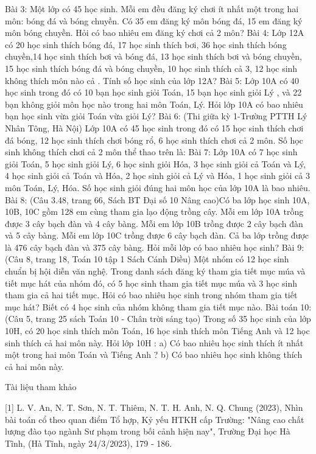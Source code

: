 \begin{multicols}{2}
	Bài 3: Một lớp có 45 học sinh. Mỗi em đều đăng ký chơi ít nhất một trong hai môn: bóng đá và bóng chuyền. Có 35 em đăng ký môn bóng đá, 15 em đăng ký môn bóng chuyền. Hỏi có bao nhiêu em đăng ký chơi cả 2 môn?
	Bài 4: Lớp 12A có 20 học sinh thích bóng đá, 17 học sinh thích bơi, 36 học sinh thích bóng chuyền,14 học sinh thích bơi và bóng đá, 13 học sinh thích bơi và bóng chuyền, 15 học sinh thích bóng đá và bóng chuyền, 10 học sinh thích cả 3, 12 học sinh không thích môn nào cả . Tính số học sinh của lớp 12A?
	Bài 5: Lớp 10A có 40 học sinh trong đó có 10 bạn học sinh giỏi Toán, 15 bạn học sinh giỏi Lý , và 22 bạn không giỏi môn học nào trong hai môn Toán, Lý. Hỏi lớp 10A có bao nhiêu bạn học sinh vừa giỏi Toán vừa giỏi Lý?
	Bài 6: (Thi giữa kỳ 1-Trường PTTH Lý Nhân Tông, Hà Nội) Lớp 10A có 45 học sinh trong đó có 15 học sinh thích chơi đá bóng, 12 học sinh thích chơi bóng rổ, 6 học sinh thích chơi cả 2 môn. Số học sinh không thích chơi cả 2 môn thể thao trên là:
	Bài 7: Lớp 10A có 7 học sinh giỏi Toán, 5 học sinh giỏi Lý, 6 học sinh giỏi Hóa, 3 học sinh giỏi cả Toán và Lý, 4 học sinh giỏi cả Toán và Hóa, 2 học sinh giỏi cả Lý và Hóa, 1 học sinh giỏi cả 3 môn Toán, Lý, Hóa. Số học sinh giỏi đúng hai môn học của lớp 10A là bao nhiêu.
	Bài 8: (Câu 3.48, trang 66, Sách BT Đại số 10 Nâng cao)Có ba lớp học sinh 10A, 10B, 10C gồm 128 em cùng tham gia lạo động trồng cây. Mỗi em lớp 10A trồng được 3 cây bạch đàn và 4 cây bàng. Mỗi em lớp 10B trồng được 2 cây bạch đàn và 5 cây bàng. Mỗi em lớp 10C trồng được 6 cây bạch đàn. Cả ba lớp trồng được là 476 cây bạch đàn và 375 cây bàng. Hỏi mỗi lớp có bao nhiêu học sinh?
	Bài 9: (Câu 8, trang 18, Toán 10 tập 1 Sách Cánh Diều) Một nhóm có 12 học sinh chuẩn bị hội diễn văn nghệ. Trong danh sách đăng ký tham gia tiết mục múa và tiết mục hát của nhóm đó, có 5 học sinh tham gia tiết mục múa và 3 học sinh tham gia cả hai tiết mục. Hỏi có bao nhiêu học sinh trong nhóm tham gia tiết mục hát? Biết có 4 học sinh của nhóm không tham gia tiết mục nào.
	Bài toán 10: (Câu 5, trang 25 sách Toán 10 - Chân trời sáng tạo) Trong số 35 học sinh của lớp 10H, có 20 học sinh thích môn Toán, 16 học sinh thích môn Tiếng Anh và 12 học sinh thích cả hai môn này. Hỏi lớp 10H :
	a)	Có bao nhiêu học sinh thích ít nhất một trong hai môn Toán và Tiếng Anh ?
	b)	Có bao nhiêu học sinh không thích cả hai môn này.
	
	Tài liệu tham khảo
	
	[1]	L. V. An, N. T. Sơn, N. T. Thiêm, N. T. H. Anh, N. Q. Chung (2023), Nhìn bài toán cổ theo quan điểm Tổ hợp, Kỷ yếu HTKH cấp Trường: "Nâng cao chất lượng đào tạo ngành Sư phạm trong bối cảnh hiện nay", Trường Đại học Hà Tĩnh, (Hà Tĩnh, ngày 24/3/2023), 179 - 186.
	

\end{multicols}
